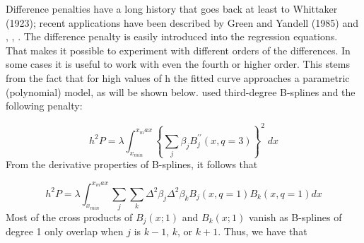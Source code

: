 \documentclass[12pt]{article}
\newcommand*\needsparaphrased{\color{red}}
\begin{document}
{ \needsparaphrased Difference penalties have a long history that goes back at least to Whittaker (1923); recent applications have been described by Green and Yandell (1985) and \cite{eilers1991penalized}, \cite{eilers1991nonparametric}, \cite{eilers1995indirect}. The difference penalty is easily introduced into the regression equations. That makes it possible to experiment with different orders of the differences. In some cases it is useful to work with even the fourth or higher order. This stems from the fact that for high values of h the fitted curve approaches a parametric (polynomial) model, as will be shown below.
\cite{o1986statistical} used third-degree B-splines and the following penalty:}

\begin{equation} \label{eq:osullivan_univariate_bspline_penalty}
h^2 P = \lambda \int_{x_{min}}^{x_max} \left\{ \sum_{j}  \beta_j B_j^{\prime \prime} \left(x, q=3\right) \right\}^2\; dx
\end{equation}
\noindent
From the derivative properties of B-splines, it follows that

\begin{equation} \label{osullivan_univariate_bspline_penalty_via_deriv}
h^2 P = \lambda \int_{x_{min}}^{x_max}  \sum_{j} \sum_{k} \Delta^2 \beta_j \Delta^2 \beta_k B_j\left(x,q=1\right)B_k\left(x,q=1\right) dx 
\end{equation}
\noindent
Most of the cross products of $B_j(x; 1)$ and $B_k(x;1)$ vanish as B-splines of degree 1 only overlap when $j$ is $k-1$, $k$, or $k+1$. Thus, we have that
\end{document}
